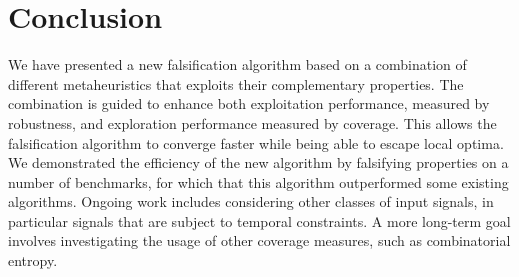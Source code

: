 \section{Conclusion}
We have presented a new falsification algorithm based on a combination of different metaheuristics that exploits their complementary properties.
The combination is guided to enhance both exploitation performance, measured by robustness, and exploration performance measured by coverage.
This allows the falsification algorithm to converge faster while being able to escape local optima. 
We demonstrated the efficiency of the new algorithm by falsifying
properties on a number of benchmarks, for which that this algorithm outperformed some existing algorithms. Ongoing work includes considering other classes of input signals, in particular signals that are subject to temporal constraints. A more long-term goal involves 
investigating the usage of other coverage measures, such as combinatorial entropy. 
